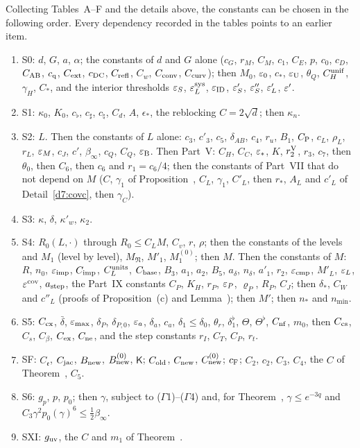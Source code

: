 Collecting Tables~A--F and the details above, the constants can be chosen in the following order. Every dependency recorded in the tables points to an earlier item.
\begin{enumerate}[label=(\arabic*)]
\item S0: $d$, $G$, $a$, $\alpha$; the constants of $d$ and $G$ alone ($c_G$, $r_M$, $C_M$, $c_1$, $C_E$, $p$, $c_0$, $c_D$, $C_{\rm AB}$, $c_{\rm q}$, $C_{\rm ext}$, $c_{\rm DC}$, $C_{\rm refl}$, $C_w$, $C_{\rm conv}$, $C_{\rm curv}$); then $M_0$, $\varepsilon_0$, $c_*$, $\varepsilon_{\rm U}$, $\theta_Q$, $C^{\rm unif}_H$, $\gamma_H$, $C_*$, and the interior thresholds $\varepsilon_S$, $\varepsilon_L^{\rm sys}$, $\varepsilon_{\rm ID}$, $\varepsilon'_S$, $\varepsilon''_S$, $\varepsilon'_L$, $\varepsilon'$.
\item S1: $\kappa_0$, $K_0$, $c_\flat$, $c_\sharp$, $c_\natural$, $C_d$, $A$, $\epsilon_*$, the reblocking $C=2\sqrt d$; then $\kappa_n$.
\item S2: $L$. Then the constants of $L$ alone: $c_3$, $c'_3$, $c_5$, $\delta_{AB}$, $c_4$, $r_u$, $B_1$, $C_{\rm P}$, $c_L$, $\rho_L$, $r_L$, $\varepsilon_M$, $c_J$, $c'$, $\beta_\infty$, $c_Q$, $C_Q$, $\varepsilon_{\rm B}$. Then Part~V: $C_H$, $C_C$, $\varepsilon_*$, $K$, $r_2^{\rm V}$, $r_3$, $c_7$, then $\theta_0$, then $C_6$, then $c_6$ and $r_1=c_6/4$; then the constants of Part~VII that do not depend on $M$ ($C$, $\gamma_1$ of Proposition~, $C_L$, $\gamma_1$, $C'_L$, then $r_*$, $A_L$ and $c'_L$ of Detail~\ref{d7:covc}, then $\gamma_C$).
\item S3: $\kappa$, $\delta$, $\kappa'_w$, $\kappa_2$.
\item S4: $R_0(L,\cdot)$ through $R_0\le C_LM$, $C_v$, $r$, $\rho$; then the constants of the levels and $M_1$ (level by level), $M_{\mathfrak N}$, $M'_1$, $M^{(0)}_1$; then $M$. Then the constants of $M$: $R$, $n_0$, $\varepsilon_{\rm imp}$, $C_{\rm imp}$, $C^{\rm units}_L$, $C_{\rm base}$, $B_3$, $a_1$, $a_2$, $B_5$, $a_\delta$, $n_\delta$, $a'_1$, $r_2$, $\varepsilon_{\rm cmp}$, $M'_L$, $\varepsilon_L$, $\varepsilon^{\rm cov}$, $a_{\rm step}$, the Part~IX constants $C_P$, $K_H$, $r_P$, $\varepsilon_P$, $\varrho_P$, $R_P$, $C_J$; then $\delta_*$, $C_W$ and $c''_L$ (proofs of Proposition~(c) and Lemma~); then $M'$; then $n_*$ and $n_{\min}$.
\item S5: $C_{\rm cx}$, $\bar\delta$, $\varepsilon_{\max}$, $\delta_P$, $\delta_{P,0}$, $\varepsilon_a$, $\delta_a$, $c_a$, $\delta_1\le\delta_0$, $\theta_r$, $\delta_1^\flat$, $\Theta$, $\Theta^\flat$, $C_{\rm nf}$, $m_0$, then $C_{\rm cs}$, $C_s$, $C_\beta$, $C_{\rm ex}$, $C_{\rm ne}$, and the step constants $r_I$, $C_T$, $C_P$, $r_t$.
\item SF: $C_{\mathfrak e}$, $C_{\rm jac}$, $B_{\rm new}$, $B^{(0)}_{\rm new}$, $\mathsf K$; $C_{\rm old}$, $C_{\rm new}$, $C^{(0)}_{\rm new}$; $c_{\rm F}$; $C_2$, $c_2$, $C_3$, $C_4$, the $C$ of Theorem~, $C_5$.
\item S6: $g_p$, $p$, $p_0$; then $\gamma$, subject to ($\Gamma$1)--($\Gamma$4) and, for Theorem~, $\gamma\le e^{-3q}$ and $C_3\gamma^2p_0(\gamma)^6\le\frac12\beta_\infty$.
\item SXI: $g_{\rm uv}$, the $C$ and $m_1$ of Theorem~.
\end{enumerate}
